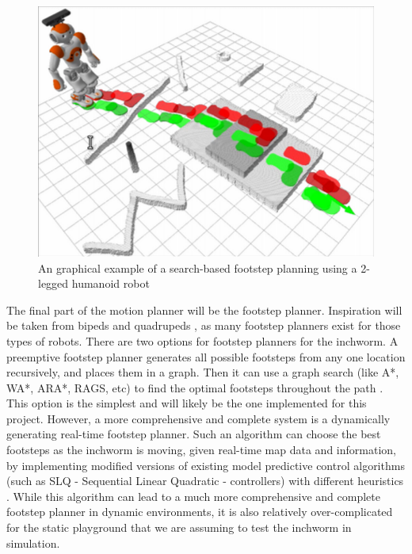 \begin{figure}[ht]
    \includegraphics[width=\linewidth]{figures/FootStepPlanner.png}
    \caption{An graphical example of a search-based footstep planning using a 2-legged humanoid robot \cite{SearchFootstepPlanner}}
    \label{fig:FootstepPlannerExample}
\end{figure} 

The final part of the motion planner will be the footstep planner. Inspiration will be taken from bipeds and quadrupeds \cite{LeggedRobotsNavPlanning}, as many footstep planners exist for those types of robots. There are two options for footstep planners for the inchworm. A preemptive footstep planner generates all possible footsteps from any one location recursively, and places them in a graph. Then it can use a graph search (like A*, WA*, ARA*, RAGS, etc) to find the optimal footsteps throughout the path \cite{SearchFootstepPlanner}. This option is the simplest and will likely be the one implemented for this project. However, a more comprehensive and complete system is a dynamically generating real-time footstep planner. Such an algorithm can choose the best footsteps as the inchworm is moving, given real-time map data and information, by implementing modified versions of existing model predictive control algorithms (such as SLQ - Sequential Linear Quadratic - controllers) with different heuristics \cite{MotionPlanningInchworm} \cite{ModelPredictiveControl}. While this algorithm can lead to a much more comprehensive and complete footstep planner in dynamic environments, it is also relatively over-complicated for the static playground that we are assuming to test the inchworm in simulation.